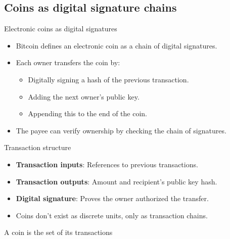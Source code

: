 \documentclass[aspectratio=169, lualatex, handout]{beamer}
\begin{document}
\subsection{Coins as digital signature chains}

\begin{frame}{Electronic coins as digital signatures}
	\begin{itemize}
		\item Bitcoin defines an electronic coin as a chain of digital signatures.
		\item Each owner transfers the coin by:
		      \begin{itemize}
			      \item Digitally signing a hash of the previous transaction.
			      \item Adding the next owner's public key.
			      \item Appending this to the end of the coin.
		      \end{itemize}
		\item The payee can verify ownership by checking the chain of signatures.
	\end{itemize}
\end{frame}

\begin{frame}{Transaction structure}
	\begin{itemize}
		\item \textbf{Transaction inputs}: References to previous transactions.
		\item \textbf{Transaction outputs}: Amount and recipient's public key hash.
		\item \textbf{Digital signature}: Proves the owner authorized the transfer.
		\item Coins don't exist as discrete units, only as transaction chains.
	\end{itemize}
\end{frame}

\begin{frame}{A coin is the set of its transactions}
\end{frame}
\end{document}
